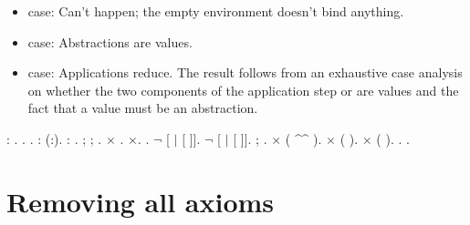 \documentclass[12pt]{report}
\begin{document}
\begin{itemize}
\item  {} case: Can't happen; the empty environment
        doesn't bind anything.



\item  {} case: Abstractions are values.



\item  {} case: Applications reduce.  The result follows
        from an exhaustive case analysis on whether the two components
        of the application step or are values and the fact that a
        value must be an abstraction. 
\end{itemize}
\begin{coqdoccode}
\coqdocemptyline
\coqdocnoindent
{}  : .\coqdoceol
\coqdocnoindent
{}.\coqdoceol
\coqdocindent{1.00em}
 .  : (:).  : .\coqdoceol
\coqdocindent{1.00em}
 ; ; .\coqdoceol
\coqdocindent{1.00em}
\ensuremath{\times} .\coqdoceol
\coqdocindent{1.00em}
\ensuremath{\times}.\coqdoceol
\coqdocindent{1.00em}
. \ensuremath{\lnot}   [ \ensuremath{|} [ ]].\coqdoceol
\coqdocindent{2.00em}
\ensuremath{\lnot}   [ \ensuremath{|} [ ]].\coqdoceol
\coqdocindent{3.00em}
 ;  . \coqdoctac{\ensuremath{\exists}}\ensuremath{\times} ( \^{}\^{} ).\coqdoceol
\coqdocindent{3.00em}
\coqdoctac{\ensuremath{\exists}}\ensuremath{\times} (  ).\coqdoceol
\coqdocindent{2.00em}
\coqdoctac{\ensuremath{\exists}}\ensuremath{\times} (  ).\coqdoceol
\coqdocnoindent
{}.\coqdoceol
\coqdocemptyline
\coqdocnoindent
{} .\coqdoceol
\coqdocemptyline
\end{coqdoccode}
\section{Removing all axioms}
\end{document}
